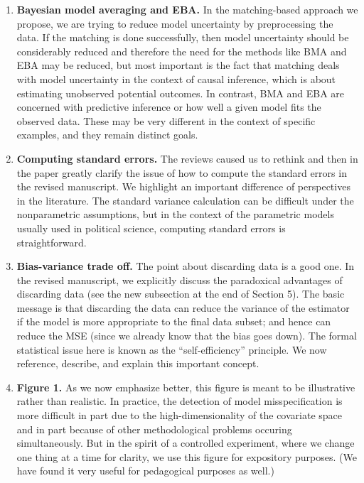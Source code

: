 \documentclass[11pt]{article}
\begin{document}
\begin{enumerate}
\item {\bf Bayesian model averaging and EBA.} In the matching-based
  approach we propose, we are trying to reduce model uncertainty by
  preprocessing the data.  If the matching is done successfully, then
  model uncertainty should be considerably reduced and therefore the
  need for the methods like BMA and EBA may be reduced, but most
  important is the fact that matching deals with model uncertainty in
  the context of causal inference, which is about estimating
  unobserved potential outcomes.  In contrast, BMA and EBA are
  concerned with predictive inference or how well a given model fits
  the observed data.  These may be very different in the context of
  specific examples, and they remain distinct goals.
  
\item {\bf Computing standard errors.}  The reviews caused us to
  rethink and then in the paper greatly clarify the issue of how to
  compute the standard errors in the revised manuscript.  We highlight
  an important difference of perspectives in the literature.  The
  standard variance calculation can be difficult under the
  nonparametric assumptions, but in the context of the parametric
  models usually used in political science, computing standard errors
  is straightforward.
  
\item {\bf Bias-variance trade off.} The point about discarding data
  is a good one.  In the revised manuscript, we explicitly discuss the
  paradoxical advantages of discarding data (see the new subsection at
  the end of Section 5). The basic message is that discarding the data
  can reduce the variance of the estimator if the model is more
  appropriate to the final data subset; and hence can reduce the MSE
  (since we already know that the bias goes down).  The formal
  statistical issue here is known as the ``self-efficiency''
  principle.  We now reference, describe, and explain this important
  concept.
  
\item {\bf Figure 1.} As we now emphasize better, this figure is meant
  to be illustrative rather than realistic. In practice, the detection
  of model misspecification is more difficult in part due to the
  high-dimensionality of the covariate space and in part because of
  other methodological problems occuring simultaneously.  But in the
  spirit of a controlled experiment, where we change one thing at a
  time for clarity, we use this figure for expository purposes.  (We
  have found it very useful for pedagogical purposes as well.)
  

\end{enumerate}
\end{document}
